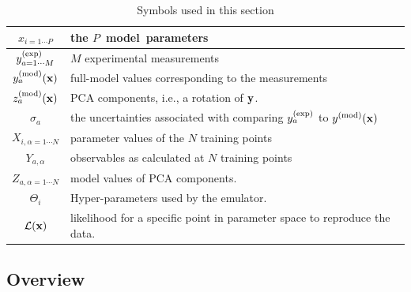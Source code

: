 \begin{table}[ht]
\begin{center}
\caption{Symbols used in this section}
\begin{tabular}{|c|l|}
\hline
$x_{i=1\cdots P}$& the $P$~{\rm model~parameters}\\
\hline
$y^{\rm(exp)}_{a=1\cdots M}$ & $M$ experimental measurements\\
\hline
$y^{\rm(mod)}_a({\bf x})$ & full-model values corresponding to the measurements\\
\hline
$z^{\rm(mod)}_a({\bf x})$ & PCA components, i.e., a rotation of ${\bf y}$.\\
\hline
$\sigma_a$ & the uncertainties associated with comparing $y^{\rm(exp)}_a$ to $y^{\rm(mod)}({\bf x})$\\
\hline
$X_{i,\alpha=1\cdots N}$ & parameter values of the $N$ training points\\
\hline
$Y_{a,\alpha}$ & observables as calculated at $N$ training points\\
\hline
$Z_{a,\alpha=1\cdots N}$ & model values of PCA components.\\
\hline
$\Theta_i$ & Hyper-parameters used by the emulator.\\
\hline
${\mathcal L}({\bf x})$ & likelihood for a specific point in parameter space to reproduce the data.\\
\hline
\end{tabular}
\end{center}
\end{table}

\subsection{Overview}

